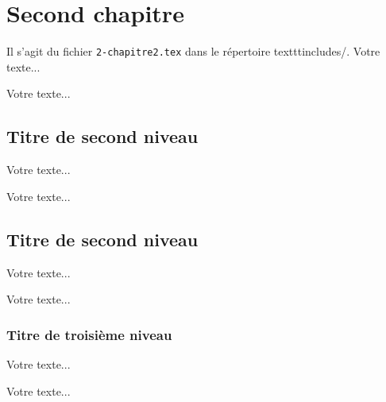 
\newpage

\section{Second chapitre}

Il s'agit du fichier \texttt{2-chapitre2.tex} dans le répertoire texttt{includes/}. Votre texte...

Votre texte...

\subsection{Titre de second niveau}

Votre texte...

Votre texte...

\subsection{Titre de second niveau}
 
Votre texte...
 
Votre texte...

\subsubsection{Titre de troisième niveau}
 
Votre texte...
 
Votre texte...

